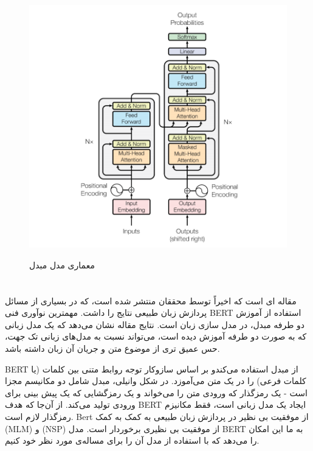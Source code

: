 \begin{figure}[H]
\centering
\caption{  معماری مدل مبدل \cite{Ashish2017Attention}}\label{RNN}
\includegraphics[width=15cm]{figs/Transformer.png}
\label{fig:test}
\end{figure}







\section{}
\cite{Jacob2019Bert}
\cite{RoBERTa}
مقاله ای است که اخیراً توسط محققان  منتشر شده است، که در بسیاری از مسائل  پردازش زبان طبیعی
نتایج را داشت.
مهمترین نوآوری فنی BERT استفاده از آموزش دو طرفه مبدل، در مدل سازی زبان است.
نتایج مقاله نشان می‌دهد که یک مدل زبانی که به صورت دو طرفه آموزش دیده است، می‌تواند نسبت به مدل‌های زبانی تک جهت، حس عمیق تری از موضوع متن و جریان آن زبان داشته باشد.

BERT از مبدل استفاده می‌کندو بر اساس سازوکار توجه  روابط متنی بین کلمات (یا کلمات فرعی) را در یک متن می‌آموزد. در شکل وانیلی، مبدل شامل دو مکانیسم مجزا است - یک رمزگذار که ورودی متن را می‌خواند و یک رمزگشایی که یک پیش بینی برای ورودی تولید می‌کند. از آن‌جا که هدف BERT ایجاد یک مدل زبانی است، فقط مکانیزم رمزگذار لازم است.
Bert از موفقیت بی نظیر در پردازش زبان طبیعی به کمک
به کمک 
(MLM) و
(NSP) از موفقیت بی نظیری برخوردار است.
مدل BERT به ما این امکان را می‌دهد که با استفاده از مدل
آن را برای مساله‌ی مورد نظر خود 
کنیم.

